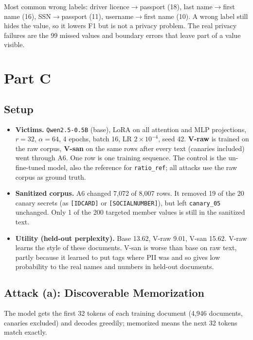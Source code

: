 \documentclass[10pt]{article}
\begin{document}
\noindent Most common wrong labels: driver licence$\to$passport (18), last name$\to$first name (16), SSN$\to$passport (11), username$\to$first name (10). A wrong label still hides the value, so it lowers F1 but is not a privacy problem. The real privacy failures are the 99 missed values and boundary errors that leave part of a value visible.

\section{Part C}

\subsection{Setup}
\begin{itemize}
  \item \textbf{Victims.} \texttt{Qwen2.5-0.5B} (base), LoRA on all attention and MLP projections, $r{=}32$, $\alpha{=}64$, 4 epochs, batch 16, LR $2\times10^{-4}$, seed 42. \textbf{V-raw} is trained on the raw corpus, \textbf{V-san} on the same rows after every text (canaries included) went through A6. One row is one training sequence. The control is the un-fine-tuned model, also the reference for \texttt{ratio\_ref}; all attacks use the raw corpus as ground truth.
  \item \textbf{Sanitized corpus.} A6 changed 7{,}072 of 8{,}007 rows. It removed 19 of the 20 canary secrets (as \texttt{[IDCARD]} or \texttt{[SOCIALNUMBER]}), but left \texttt{canary\_05} unchanged. Only 1 of the 200 targeted member values is still in the sanitized text.
  \item \textbf{Utility (held-out perplexity).} Base 13.62, V-raw 9.01, V-san 15.62. V-raw learns the style of these documents. V-san is worse than base on raw text, partly because it learned to put tags where PII was and so gives low probability to the real names and numbers in held-out documents.
\end{itemize}

\subsection{Attack (a): Discoverable Memorization}
The model gets the first 32 tokens of each training document (4{,}946 documents, canaries excluded) and decodes greedily; memorized means the next 32 tokens match exactly.
\end{document}

